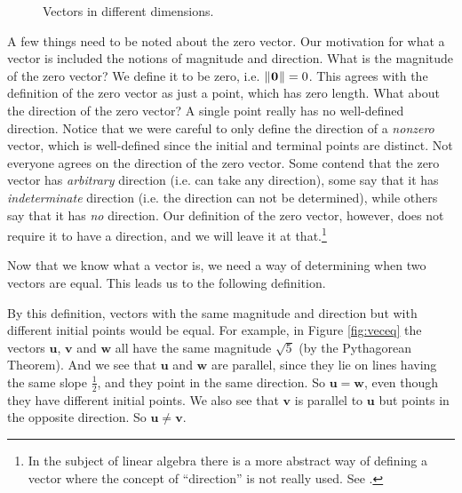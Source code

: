 \begin{figure}[h]
 \centering
 \qquad
 \qquad
 \caption[]{\quad Vectors in different dimensions.}
 \label{fig:vecs}
\end{figure}

A few things need to be noted about the zero vector.
Our motivation for what a vector is included the notions of
magnitude and direction. What is the magnitude of the zero vector? We define it to be zero, i.e.
$\lVert\mspace{1mu}\mathbf{0}\mspace{1mu}\rVert = 0$.
This agrees with the definition of the zero vector as just a point, which has zero length.  What about the
direction of the zero vector?  A single point really has no well-defined direction.  Notice that we were careful
to only define the direction of a \emph{nonzero} vector, which is well-defined since the initial and
terminal points are distinct.
Not everyone agrees on the direction of the zero vector.  Some contend that the zero vector has \emph{arbitrary}
direction (i.e. can take any direction), some say that it has \emph{indeterminate} direction (i.e. the direction can
not be determined), while others say that it has \emph{no} direction. Our definition of the zero vector, however,
does not require it to have a direction, and we will leave it at that.\footnote{In the subject of linear algebra
there is a more abstract way of defining a vector where the concept of ``direction'' is not really used.
See \cite{ar}.}

Now that we know what a vector is, we need a way of determining when two vectors are equal.  This leads us to the
following definition.

By this definition, vectors with the same magnitude and direction but with different initial points would be
equal. 
For example, in Figure \ref{fig:veceq} the vectors $\mathbf{u}$, $\mathbf{v}$ and $\mathbf{w}$ all have the same
magnitude $\sqrt 5$ (by the Pythagorean Theorem).  
And we see that $\mathbf{u}$ and $\mathbf{w}$ are parallel, since they
lie on lines having the same slope $\frac{1}{2}$, and they point in the same direction. So $\mathbf{u} = \mathbf{w}$,
even though they have different initial points.  
We also see that $\mathbf{v}$ is parallel to $\mathbf{u}$ but points in the
opposite direction. So $\mathbf{u} \ne \mathbf{v}$.

